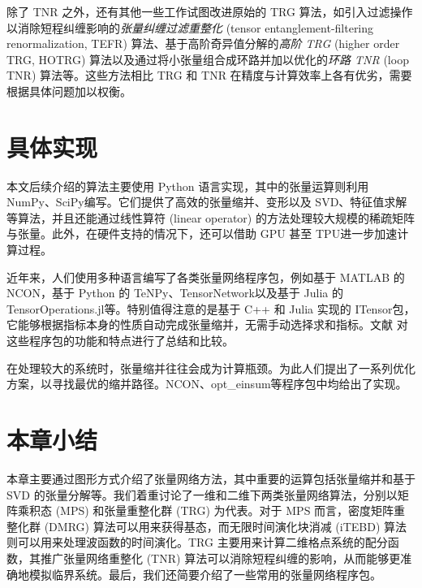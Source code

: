除了 TNR 之外，还有其他一些工作试图改进原始的 TRG 算法，如引入过滤操作以消除短程纠缠影响的\emph{张量纠缠过滤重整化} (tensor entanglement-filtering renormalization, TEFR) 算法\cite{gu2009tensor1}、基于高阶奇异值分解的\emph{高阶 TRG} (higher order TRG, HOTRG) 算法\cite{xie2012coarse}以及通过将小张量组合成环路并加以优化的\emph{环路 TNR} (loop TNR) 算法\cite{yang2017loop}等。这些方法相比 TRG 和 TNR 在精度与计算效率上各有优劣，需要根据具体问题加以权衡。

\section{具体实现}

本文后续介绍的算法主要使用 Python 语言实现，其中的张量运算则利用 NumPy\cite{harris2020array}、SciPy\cite{virtanen2020scipy}编写。它们提供了高效的张量缩并、变形以及 SVD、特征值求解等算法，并且还能通过线性算符 (linear operator) 的方法处理较大规模的稀疏矩阵与张量。此外，在硬件支持的情况下，还可以借助 GPU 甚至 TPU\cite{ganahl2023density}进一步加速计算过程。

近年来，人们使用多种语言编写了各类张量网络程序包，例如基于 MATLAB 的 NCON\cite{pfeifer2014ncon}，基于 Python 的 TeNPy\cite{hauschild2018efficient}、TensorNetwork\cite{roberts2019tensornetwork}以及基于 Julia 的 TensorOperations.jl\cite{jutho2023tensoroperations}等。特别值得注意的是基于 C++ 和 Julia 实现的 ITensor\cite{fishman2022itensor}包，它能够根据指标本身的性质自动完成张量缩并，无需手动选择求和指标。文献 \parencite{psarras2021landscape} 对这些程序包的功能和特点进行了总结和比较。

在处理较大的系统时，张量缩并往往会成为计算瓶颈。为此人们提出了一系列优化方案\cite{pfeifer2014faster,evenbly2014improving}，以寻找最优的缩并路径。NCON、opt\_einsum\cite{daniel2018opteinsum}等程序包中均给出了实现。

\section{本章小结}

本章主要通过图形方式介绍了张量网络方法，其中重要的运算包括张量缩并和基于 SVD 的张量分解等。我们着重讨论了一维和二维下两类张量网络算法，分别以矩阵乘积态 (MPS) 和张量重整化群 (TRG) 为代表。对于 MPS 而言，密度矩阵重整化群 (DMRG) 算法可以用来获得基态，而无限时间演化块消减 (iTEBD) 算法则可以用来处理波函数的时间演化。TRG 主要用来计算二维格点系统的配分函数，其推广张量网络重整化 (TNR) 算法可以消除短程纠缠的影响，从而能够更准确地模拟临界系统。最后，我们还简要介绍了一些常用的张量网络程序包。
